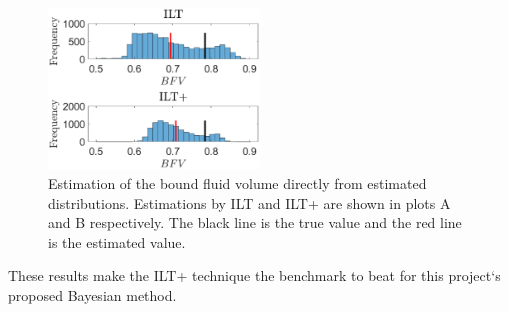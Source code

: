 \begin{figure}[ht!]
    \centering
    \includegraphics[width=0.5\textwidth]{backgroundVector/bfvSimulate.eps}
    \caption{Estimation of the bound fluid volume directly from estimated distributions. Estimations by ILT and ILT+ are shown in plots A and B respectively. The black line is the true value and the red line is the estimated value.}
    \label{fig:BFVILT+}
\end{figure}

These results make the ILT+ technique the benchmark to beat for this project`s proposed Bayesian method.
    
    
    










